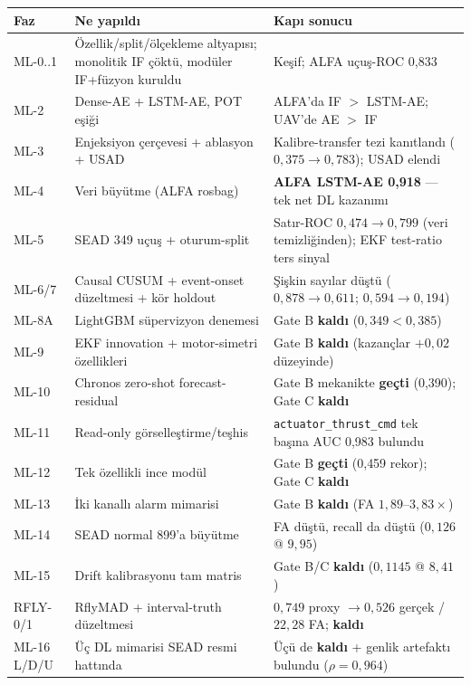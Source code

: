\documentclass[11pt,a4paper]{article}
\newcommand{\code}[1]{\texttt{\small #1}}
\newcommand{\gatefail}[1]{\textcolor{failred}{\textbf{#1}}}
\newcommand{\gatepass}[1]{\textcolor{okgreen}{\textbf{#1}}}
\begin{document}
\begin{small}
\begin{longtable}{@{}p{}p{}p{}@{}}
\toprule
\textbf{Faz} & \textbf{Ne yapıldı} & \textbf{Kapı sonucu} \\
\midrule
\endhead
ML-0..1 & Özellik/split/ölçekleme altyapısı; monolitik IF çöktü, modüler IF+füzyon kuruldu & Keşif; ALFA uçuş-ROC 0{,}833 \\
ML-2 & Dense-AE + LSTM-AE, POT eşiği & ALFA'da IF $>$ LSTM-AE; UAV'de AE $>$ IF \\
ML-3 & Enjeksiyon çerçevesi + ablasyon + USAD & Kalibre-transfer tezi kanıtlandı ($0{,}375\to0{,}783$); USAD elendi \\
ML-4 & Veri büyütme (ALFA rosbag) & \gatepass{ALFA LSTM-AE 0{,}918} --- tek net DL kazanımı \\
ML-5 & SEAD 349 uçuş + oturum-split & Satır-ROC $0{,}474\to0{,}799$ (veri temizliğinden); EKF test-ratio ters sinyal \\
ML-6/7 & Causal CUSUM + event-onset düzeltmesi + kör holdout & Şişkin sayılar düştü ($0{,}878\to0{,}611$; $0{,}594\to0{,}194$) \\
ML-8A & LightGBM süpervizyon denemesi & Gate B \gatefail{kaldı} ($0{,}349 < 0{,}385$) \\
ML-9 & EKF innovation + motor-simetri özellikleri & Gate B \gatefail{kaldı} (kazançlar $+0{,}02$ düzeyinde) \\
ML-10 & Chronos zero-shot forecast-residual & Gate B mekanikte \gatepass{geçti} (0{,}390); Gate C \gatefail{kaldı} \\
ML-11 & Read-only görselleştirme/teşhis & \code{actuator\_thrust\_cmd} tek başına AUC 0{,}983 bulundu \\
ML-12 & Tek özellikli ince modül & Gate B \gatepass{geçti} (0{,}459 rekor); Gate C \gatefail{kaldı} \\
ML-13 & İki kanallı alarm mimarisi & Gate B \gatefail{kaldı} (FA $1{,}89$--$3{,}83\times$) \\
ML-14 & SEAD normal 899'a büyütme & FA düştü, recall da düştü ($0{,}126$ @ $9{,}95$) \\
ML-15 & Drift kalibrasyonu tam matris & Gate B/C \gatefail{kaldı} ($0{,}1145$ @ $8{,}41$) \\
RFLY-0/1 & RflyMAD + interval-truth düzeltmesi & $0{,}749$ proxy $\to 0{,}526$ gerçek / $22{,}28$ FA; \gatefail{kaldı} \\
ML-16 L/D/U & Üç DL mimarisi SEAD resmi hattında & Üçü de \gatefail{kaldı} + genlik artefaktı bulundu ($\rho=0{,}964$) \\

\end{longtable}
\end{small}
\end{document}
